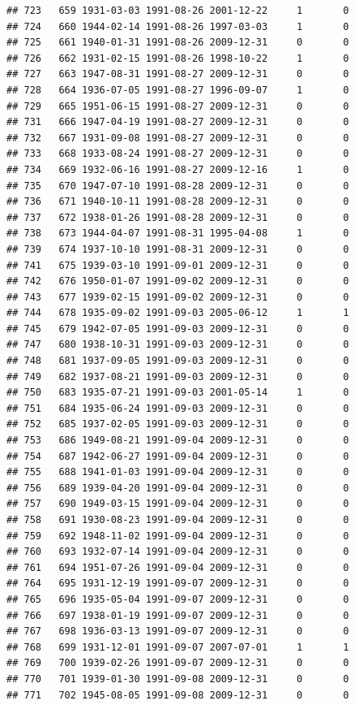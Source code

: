 \documentclass[
]{book}
\theoremstyle{definition}
\theoremstyle{definition}
\theoremstyle{definition}
\theoremstyle{definition}
\theoremstyle{remark}
\begin{document}
\begin{verbatim}
## 723   659 1931-03-03 1991-08-26 2001-12-22     1       0
## 724   660 1944-02-14 1991-08-26 1997-03-03     1       0
## 725   661 1940-01-31 1991-08-26 2009-12-31     0       0
## 726   662 1931-02-15 1991-08-26 1998-10-22     1       0
## 727   663 1947-08-31 1991-08-27 2009-12-31     0       0
## 728   664 1936-07-05 1991-08-27 1996-09-07     1       0
## 729   665 1951-06-15 1991-08-27 2009-12-31     0       0
## 731   666 1947-04-19 1991-08-27 2009-12-31     0       0
## 732   667 1931-09-08 1991-08-27 2009-12-31     0       0
## 733   668 1933-08-24 1991-08-27 2009-12-31     0       0
## 734   669 1932-06-16 1991-08-27 2009-12-16     1       0
## 735   670 1947-07-10 1991-08-28 2009-12-31     0       0
## 736   671 1940-10-11 1991-08-28 2009-12-31     0       0
## 737   672 1938-01-26 1991-08-28 2009-12-31     0       0
## 738   673 1944-04-07 1991-08-31 1995-04-08     1       0
## 739   674 1937-10-10 1991-08-31 2009-12-31     0       0
## 741   675 1939-03-10 1991-09-01 2009-12-31     0       0
## 742   676 1950-01-07 1991-09-02 2009-12-31     0       0
## 743   677 1939-02-15 1991-09-02 2009-12-31     0       0
## 744   678 1935-09-02 1991-09-03 2005-06-12     1       1
## 745   679 1942-07-05 1991-09-03 2009-12-31     0       0
## 747   680 1938-10-31 1991-09-03 2009-12-31     0       0
## 748   681 1937-09-05 1991-09-03 2009-12-31     0       0
## 749   682 1937-08-21 1991-09-03 2009-12-31     0       0
## 750   683 1935-07-21 1991-09-03 2001-05-14     1       0
## 751   684 1935-06-24 1991-09-03 2009-12-31     0       0
## 752   685 1937-02-05 1991-09-03 2009-12-31     0       0
## 753   686 1949-08-21 1991-09-04 2009-12-31     0       0
## 754   687 1942-06-27 1991-09-04 2009-12-31     0       0
## 755   688 1941-01-03 1991-09-04 2009-12-31     0       0
## 756   689 1939-04-20 1991-09-04 2009-12-31     0       0
## 757   690 1949-03-15 1991-09-04 2009-12-31     0       0
## 758   691 1930-08-23 1991-09-04 2009-12-31     0       0
## 759   692 1948-11-02 1991-09-04 2009-12-31     0       0
## 760   693 1932-07-14 1991-09-04 2009-12-31     0       0
## 761   694 1951-07-26 1991-09-04 2009-12-31     0       0
## 764   695 1931-12-19 1991-09-07 2009-12-31     0       0
## 765   696 1935-05-04 1991-09-07 2009-12-31     0       0
## 766   697 1938-01-19 1991-09-07 2009-12-31     0       0
## 767   698 1936-03-13 1991-09-07 2009-12-31     0       0
## 768   699 1931-12-01 1991-09-07 2007-07-01     1       1
## 769   700 1939-02-26 1991-09-07 2009-12-31     0       0
## 770   701 1939-01-30 1991-09-08 2009-12-31     0       0
## 771   702 1945-08-05 1991-09-08 2009-12-31     0       0

\end{verbatim}
\end{document}
